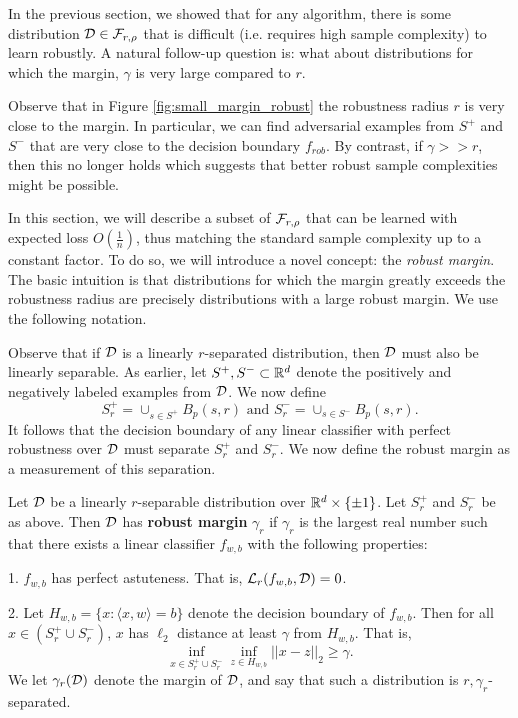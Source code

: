 In the previous section, we showed that for any algorithm, there is some distribution ${\mathcal D} \in {\mathcal F}_{r, \rho}$ that is difficult (i.e. requires high sample complexity) to learn robustly. A natural follow-up question is: what about distributions for which the margin, $\gamma$ is very large compared to $r$. 

Observe that in Figure \ref{fig:small_margin_robust} the robustness radius $r$ is very close to the margin. In particular, we can find adversarial examples from $S^+$ and $S^-$ that are very close to the decision boundary $f_{rob}$. By contrast, if $\gamma >> r$, then this no longer holds which suggests that better robust sample complexities might be possible.

In this section, we will describe a subset of ${\mathcal F}_{r, \rho}$ that can be learned with expected loss $O(\frac{1}{n})$, thus matching the standard sample complexity up to a constant factor. To do so, we will introduce a novel concept: the \textit{robust margin}. The basic intuition is that distributions for which the margin greatly exceeds the robustness radius are precisely distributions with a large robust margin. We use the following notation.

Observe that if ${\mathcal D}$ is a linearly $r$-separated distribution, then ${\mathcal D}$ must also be linearly separable. As earlier, let $S^+, S^- \subset \mathbb R^d$ denote the positively and negatively labeled examples from ${\mathcal D}$. We now define \begin{equation}\label{eqn:s_plus_s_minus} S_r^+ = \cup_{s \in S^+} B_p(s, r)\text{ and }S_r^{-} = \cup_{s \in S^-} B_p(s,r).\end{equation} It follows that the decision boundary of any linear classifier with perfect robustness over ${\mathcal D}$ must separate $S_r^+$ and $S_r^-$. We now define the robust margin as a measurement of this separation.

\begin{defn}\label{def:robust_margin}
Let ${\mathcal D}$ be a linearly $r$-separable distribution over $\mathbb R^d \times \{\pm 1\}$. Let $S_r^+$ and $S_r^-$ be as above. Then ${\mathcal D}$ has \textbf{robust margin} $\gamma_r$ if $\gamma_r$ is the largest real number such that there exists a linear classifier $f_{w,b}$ with the following properties: 

1. $f_{w,b}$ has perfect astuteness. That is, $\mathcal L_r(f_{w,b}, {\mathcal D}) = 0$. 

2. Let $H_{w,b} = \{x: \langle x, w \rangle = b\}$ denote the decision boundary of $f_{w,b}$. Then for all $x \in (S_r^+ \cup S_r^-)$, $x$ has $\ell_2$ distance at least $\gamma$ from $H_{w,b}$. That is, $$\inf_{x \in S_r^+ \cup S_r^-} \inf_{z \in H_{w,b}} ||x - z||_2 \geq \gamma.$$ We let $\gamma_r({\mathcal D})$ denote the margin of ${\mathcal D}$, and say that such a distribution is $r, \gamma_r$-separated. 
\end{defn}

